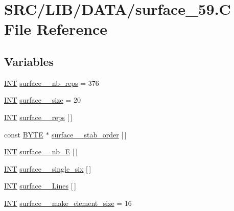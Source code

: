 \hypertarget{surface__59_8_c}{}\section{S\+R\+C/\+L\+I\+B/\+D\+A\+T\+A/surface\+\_\+59.C File Reference}
\label{surface__59_8_c}
\subsection*{Variables}
\begin{DoxyCompactItemize}
\item 
\mbox{\hyperlink{galois_8h_a09fddde158a3a20bd2dcadb609de11dc}{I\+NT}} \mbox{\hyperlink{surface__59_8_c_a0d71e2f8b647da9222f7dc87afb94652}{surface\+\_\+\_\+nb\+\_\+reps}} = 376
\item 
\mbox{\hyperlink{galois_8h_a09fddde158a3a20bd2dcadb609de11dc}{I\+NT}} \mbox{\hyperlink{surface__59_8_c_a8a04177451ae559f0c7ffb8214d04a2d}{surface\+\_\+\_\+size}} = 20
\item 
\mbox{\hyperlink{galois_8h_a09fddde158a3a20bd2dcadb609de11dc}{I\+NT}} \mbox{\hyperlink{surface__59_8_c_acab7ccc8a0b896b4f758e166c04032ca}{surface\+\_\+\_\+reps}} \mbox{[}$\,$\mbox{]}
\item 
const \mbox{\hyperlink{galois_8h_ab6cc7b4aeb6ea31aba2b3fbfc83ff5e6}{B\+Y\+TE}} $\ast$ \mbox{\hyperlink{surface__59_8_c_a4954a7308848d515eebe698db782fe89}{surface\+\_\+\_\+stab\+\_\+order}} \mbox{[}$\,$\mbox{]}
\item 
\mbox{\hyperlink{galois_8h_a09fddde158a3a20bd2dcadb609de11dc}{I\+NT}} \mbox{\hyperlink{surface__59_8_c_a9080daad1a0a5e411b3b623352ae04c6}{surface\+\_\+\_\+nb\+\_\+E}} \mbox{[}$\,$\mbox{]}
\item 
\mbox{\hyperlink{galois_8h_a09fddde158a3a20bd2dcadb609de11dc}{I\+NT}} \mbox{\hyperlink{surface__59_8_c_a675f260cd2e3aa04a197efe51f73cc5b}{surface\+\_\+\_\+single\+\_\+six}} \mbox{[}$\,$\mbox{]}
\item 
\mbox{\hyperlink{galois_8h_a09fddde158a3a20bd2dcadb609de11dc}{I\+NT}} \mbox{\hyperlink{surface__59_8_c_aa086605bc10c1df53c16f4e6342379a4}{surface\+\_\+\_\+\+Lines}} \mbox{[}$\,$\mbox{]}
\item 
\mbox{\hyperlink{galois_8h_a09fddde158a3a20bd2dcadb609de11dc}{I\+NT}} \mbox{\hyperlink{surface__59_8_c_af7fa33c7005953462118e51213a1bed0}{surface\+\_\+\_\+make\+\_\+element\+\_\+size}} = 16
\item 

\end{DoxyCompactItemize}
